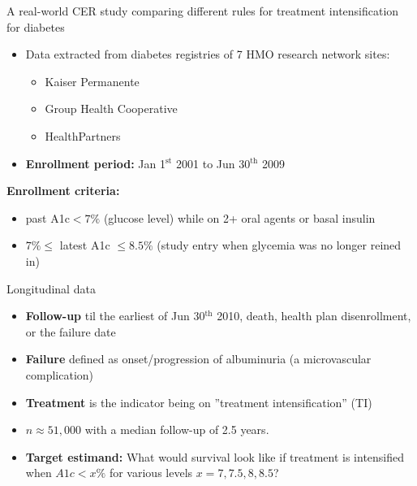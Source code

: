 \documentclass[t]{beamer}
\begin{document}

\begin{frame}{A real-world CER study comparing different rules for treatment intensification for diabetes}
\begin{itemize}
\item Data extracted from diabetes registries of 7 HMO research network sites: 
\begin{itemize}
\item Kaiser Permanente
\item Group Health Cooperative 
\item HealthPartners
\end{itemize}
\item  {\bf Enrollment period:} Jan 1$^{\textrm{st}}$ 2001 to Jun 30$^{\textrm{th}}$ 2009
\end{itemize}
 {\bf Enrollment criteria:} \\ 
\vspace{-0.2cm}\begin{itemize}
\item past A1c$<7\%$ (glucose level) while on 2+ oral agents or basal insulin 
\item $7\%\leq$ latest A1c $\leq 8.5\%$  (study entry when glycemia was no longer reined in)
\end{itemize}
\end{frame}
\begin{frame}{Longitudinal data}

\begin{itemize}
\item {\bf Follow-up} til the earliest of Jun 30$^{\textrm{th}}$ 2010, death, health plan disenrollment, or the failure date
\item {\bf Failure} defined as onset/progression of albuminuria (a microvascular complication) 
\item {\bf Treatment} is the indicator being on ''treatment intensification'' (TI)
\item $n\approx 51,000$ with a median follow-up of 2.5 years.
\item {\bf Target estimand:} What would survival look like if treatment is intensified when $A1c<x\%$ for various levels $x=7,7.5,8,8.5$?
\end{itemize}
\end{frame}
\end{document}
